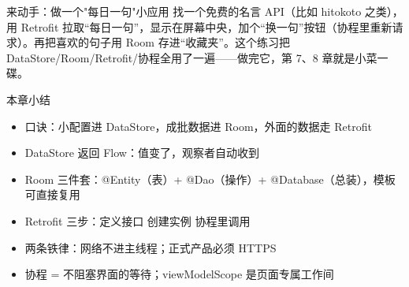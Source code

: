 \begin{tcbpractice}{来动手：做一个"每日一句"小应用}
找一个免费的名言 API（比如 hitokoto 之类），用 Retrofit 拉取“每日一句”，显示在屏幕中央，加个“换一句”按钮（协程里重新请求）。再把喜欢的句子用 Room 存进“收藏夹”。这个练习把 DataStore/Room/Retrofit/协程全用了一遍——做完它，第 7、8 章就是小菜一碟。

\end{tcbpractice}

\begin{tcbsummary}{本章小结}
\begin{itemize}
  \item 口诀：小配置进 DataStore，成批数据进 Room，外面的数据走 Retrofit
  \item DataStore 返回 Flow：值变了，观察者自动收到
  \item Room 三件套：@Entity（表）+ @Dao（操作）+ @Database（总装），模板可直接复用
  \item Retrofit 三步：定义接口 创建实例 协程里调用
  \item 两条铁律：网络不进主线程；正式产品必须 HTTPS
  \item 协程 = 不阻塞界面的等待；viewModelScope 是页面专属工作间
\end{itemize}

\end{tcbsummary}
